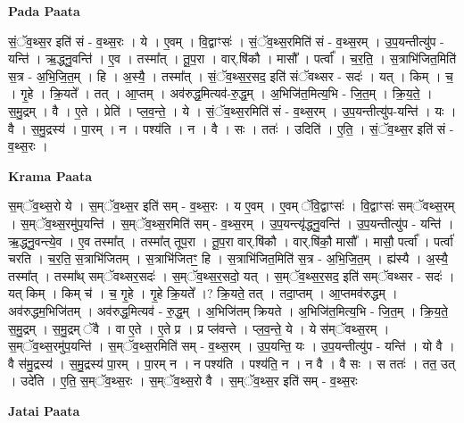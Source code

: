 \documentclass[17pt]{extarticle}
\begin{document}
\textbf{Pada Paata} \newline

सं॒ॅव॒थ्स॒र इति॑ सं - व॒थ्स॒रः । ये । ए॒वम् । वि॒द्वाꣳसः॑ । सं॒ॅव॒थ्स॒रमिति॑ सं - व॒थ्स॒रम् । उ॒प॒यन्तीत्यु॑प - यन्ति॑ । ऋ॒द्ध्नु॒वन्ति॑ । ए॒व । तस्मा᳚त् । तू॒प॒रा । वार्.षि॑कौ । मासौ᳚ । पर्त्वा᳚ । च॒र॒ति॒ । स॒त्राभि॑जित॒मिति॑ स॒त्र - अ॒भि॒जि॒त॒म् । हि । अ॒स्यै॒ । तस्मा᳚त् । सं॒ॅव॒थ्स॒र॒सद॒ इति॑ संॅवथ्सर - सदः॑ । यत् । किम् । च॒ । गृ॒हे । क्रि॒यते᳚ । तत् । आ॒प्तम् । अव॑रुद्ध॒मित्यव॑-रु॒द्ध॒म् । अ॒भिजि॑त॒मित्य॒भि - जि॒त॒म् । क्रि॒य॒ते॒ । स॒मु॒द्रम् । वै । ए॒ते । प्रेति॑ । प्ल॒व॒न्ते॒ । ये । सं॒ॅव॒थ्स॒रमिति॑ सं - व॒थ्स॒रम् । उ॒प॒यन्तीत्यु॑प-यन्ति॑ । यः । वै । स॒मु॒द्रस्य॑ । पा॒रम् । न । पश्य॑ति । न । वै । सः । ततः॑ । उदिति॑ । ए॒ति॒ । सं॒ॅव॒थ्स॒र इति॑ सं - व॒थ्स॒रः ।  \newline


\textbf{Krama Paata} \newline

स॒म्ॅव॒थ्स॒रो ये । स॒म्ॅव॒थ्स॒र इति॑ सम् - व॒थ्स॒रः । य ए॒वम् । ए॒वम् ॅवि॒द्वाꣳसः॑ । वि॒द्वाꣳसः॑ सम्ॅवथ्स॒रम् । स॒म्ॅव॒थ्स॒रमु॑प॒यन्ति॑ । स॒म्ॅव॒थ्स॒रमिति॑ सम् - व॒थ्स॒रम् । उ॒प॒यन्त्यृ॑द्ध्नु॒वन्ति॑ । उ॒प॒यन्तीत्यु॑प - यन्ति॑ । ऋ॒द्ध्नु॒वन्त्ये॒व । ए॒व तस्मा᳚त् । तस्मा᳚त् तूप॒रा । तू॒प॒रा वार्.षि॑कौ । वार्.षि॑कौ॒ मासौ᳚ । मासौ॒ पर्त्वा᳚ । पर्त्वा॑ चरति । च॒र॒ति॒ स॒त्राभि॑जितम् । स॒त्राभि॑जितꣳ॒॒ हि । स॒त्राभि॑जित॒मिति॑ स॒त्र - अ॒भि॒जि॒त॒म् । ह्य॑स्यै । अ॒स्यै॒ तस्मा᳚त् । तस्मा᳚थ् सम्ॅवथ्सर॒सदः॑ । स॒म्ॅव॒थ्स॒र॒सदो॒ यत् । स॒म्ॅव॒थ्स॒र॒सद॒ इति॑ सम्ॅवथ्सर - सदः॑ । यत् किम् । किम् च॑ । च॒ गृ॒हे । गृ॒हे क्रि॒यते᳚ ।? क्रि॒यते॒ तत् । तदा॒प्तम् । आ॒प्तमव॑रुद्धम् । अव॑रुद्धम॒भिजि॑तम् । अव॑रुद्ध॒मित्यव॑ - रु॒द्ध॒म् । अ॒भिजि॑तम् क्रियते । अ॒भिजि॑त॒मित्य॒भि - जि॒त॒म् । क्रि॒य॒ते॒ स॒मु॒द्रम् । स॒मु॒द्रम् ॅवै । वा ए॒ते । ए॒ते प्र । प्र प्ल॑वन्ते । प्ल॒व॒न्ते॒ ये । ये स॑म्ॅवथ्स॒रम् । स॒म्ॅव॒थ्स॒रमु॑प॒यन्ति॑ । स॒म्ॅव॒थ्स॒रमिति॑ सम् - व॒थ्स॒रम् । उ॒प॒यन्ति॒ यः । उ॒प॒यन्तीत्यु॑प - यन्ति॑ । यो वै । वै स॑मु॒द्रस्य॑ । स॒मु॒द्रस्य॑ पा॒रम् । पा॒रम् न । न पश्य॑ति । पश्य॑ति॒ न । न वै । वै सः । स ततः॑ । तत॒ उत् । उदे॑ति । ए॒ति॒ स॒म्ॅव॒थ्स॒रः । स॒म्ॅव॒थ्स॒रो वै । स॒म्ॅव॒थ्स॒र इति॑ सम् - व॒थ्स॒रः \newline

\textbf{Jatai Paata} \newline
\end{document}
